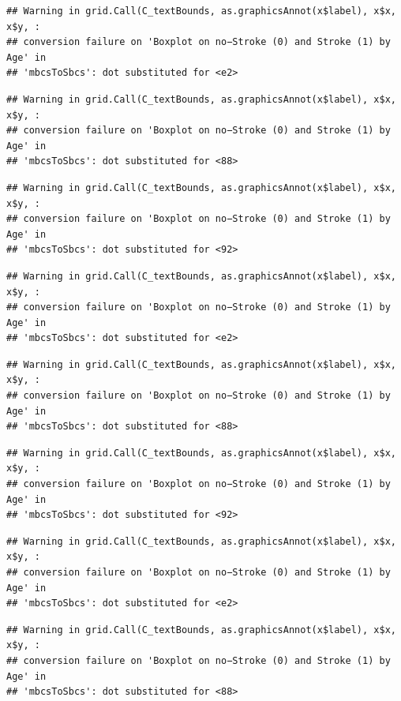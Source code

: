 \documentclass[
]{article}
\renewcommand{\=}[1]{\stackrel{#1}{=}}
\theoremstyle{definition}
\theoremstyle{remark}
\begin{document}
\begin{verbatim}
## Warning in grid.Call(C_textBounds, as.graphicsAnnot(x$label), x$x, x$y, :
## conversion failure on 'Boxplot on no−Stroke (0) and Stroke (1) by Age' in
## 'mbcsToSbcs': dot substituted for <e2>
\end{verbatim}

\begin{verbatim}
## Warning in grid.Call(C_textBounds, as.graphicsAnnot(x$label), x$x, x$y, :
## conversion failure on 'Boxplot on no−Stroke (0) and Stroke (1) by Age' in
## 'mbcsToSbcs': dot substituted for <88>
\end{verbatim}

\begin{verbatim}
## Warning in grid.Call(C_textBounds, as.graphicsAnnot(x$label), x$x, x$y, :
## conversion failure on 'Boxplot on no−Stroke (0) and Stroke (1) by Age' in
## 'mbcsToSbcs': dot substituted for <92>
\end{verbatim}

\begin{verbatim}
## Warning in grid.Call(C_textBounds, as.graphicsAnnot(x$label), x$x, x$y, :
## conversion failure on 'Boxplot on no−Stroke (0) and Stroke (1) by Age' in
## 'mbcsToSbcs': dot substituted for <e2>
\end{verbatim}

\begin{verbatim}
## Warning in grid.Call(C_textBounds, as.graphicsAnnot(x$label), x$x, x$y, :
## conversion failure on 'Boxplot on no−Stroke (0) and Stroke (1) by Age' in
## 'mbcsToSbcs': dot substituted for <88>
\end{verbatim}

\begin{verbatim}
## Warning in grid.Call(C_textBounds, as.graphicsAnnot(x$label), x$x, x$y, :
## conversion failure on 'Boxplot on no−Stroke (0) and Stroke (1) by Age' in
## 'mbcsToSbcs': dot substituted for <92>
\end{verbatim}

\begin{verbatim}
## Warning in grid.Call(C_textBounds, as.graphicsAnnot(x$label), x$x, x$y, :
## conversion failure on 'Boxplot on no−Stroke (0) and Stroke (1) by Age' in
## 'mbcsToSbcs': dot substituted for <e2>
\end{verbatim}

\begin{verbatim}
## Warning in grid.Call(C_textBounds, as.graphicsAnnot(x$label), x$x, x$y, :
## conversion failure on 'Boxplot on no−Stroke (0) and Stroke (1) by Age' in
## 'mbcsToSbcs': dot substituted for <88>
\end{verbatim}
\end{document}
